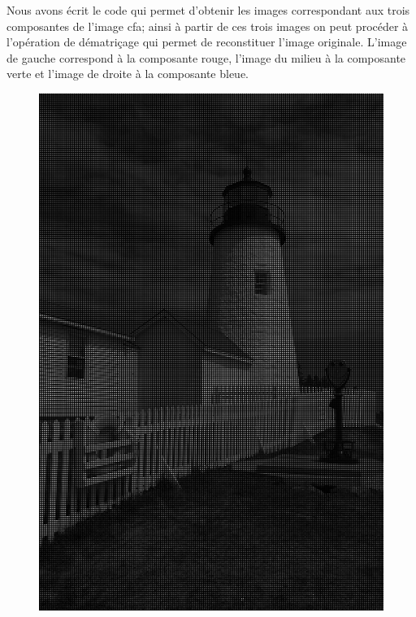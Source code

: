 \documentclass[a4paper,12pt]{report}
\begin{document}
Nous avons écrit le code qui permet d'obtenir les images correspondant aux trois composantes de l'image cfa; ainsi à partir de ces trois images on peut procéder à l'opération de dématriçage qui permet de reconstituer l'image originale. L'image de gauche correspond à la composante rouge, l'image du milieu à la composante verte et l'image de droite à la composante bleue.
\begin{figure}[!ht]
\center
	\includegraphics[scale=0.3]{./image/part2-23Rouge.png}

\end{figure}
\end{document}

